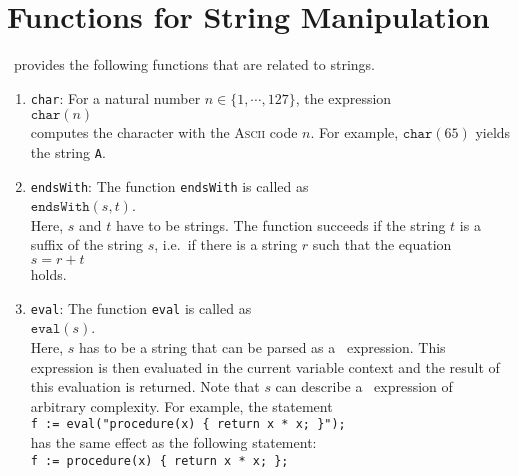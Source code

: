 \section{Functions for String Manipulation}
\setlx\ provides the following functions that are related to strings.
\begin{enumerate}
\item \texttt{char}:  For a natural number $n \in \{ 1, \cdots, 127 \}$,  the expression
      \\[0.2cm]
      \hspace*{1.3cm}
      $\mathtt{char}(n)$
      \\[0.2cm]
      computes the character with the \textsc{Ascii} code $n$.  For example,
      $\mathtt{char}(65)$ yields the string \texttt{A}.
\item \texttt{endsWith}: The function \texttt{endsWith} is called as
      \\[0.2cm]
      \hspace*{1.3cm}
      $\texttt{endsWith}(s,t)$.
      \\[0.2cm]
      Here, $s$ and $t$ have to be strings.  The function succeeds if the string $t$ is a
      suffix of the string $s$, i.e.~if there is a string $r$ such that the equation
      \\[0.2cm]
      \hspace*{1.3cm}
      $s = r + t$
      \\[0.2cm] 
      holds.
\item \texttt{eval}: The function \texttt{eval}  is called as
      \\[0.2cm]
      \hspace*{1.3cm}
      $\mathtt{eval}(s)$.
      \\[0.2cm]
      Here, $s$ has to be a string that can be parsed as a \setlx\ expression.  This expression
      is then evaluated in the current variable context and the result of this evaluation is
      returned.   Note that $s$ can describe a \setlx\ expression of arbitrary complexity.
      For example, the statement
      \\[0.2cm]
      \hspace*{1.3cm}
      \texttt{f := eval("procedure(x) \{ return x * x; \}");}
      \\[0.2cm]
      has the same effect as the following statement:
      \\[0.2cm]
      \hspace*{1.3cm}
      \texttt{f := procedure(x) \{ return x * x; \};}
      \\[0.2cm]

\end{enumerate}
